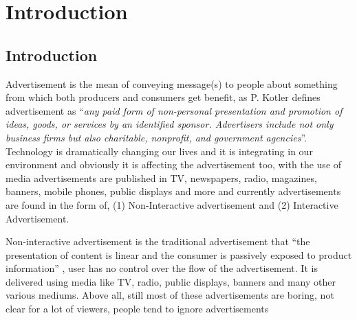 
\chapter{Introduction} %

\label{Chapter1} %
\newpage



\section{Introduction}
Advertisement is the mean of conveying message(s) to people about something from which both producers and consumers get benefit, as P. Kotler \cite{ad_def} defines advertisement as ``\emph{any paid form of non-personal presentation and promotion of ideas, goods, or services by an identified sponsor. Advertisers include not only business firms but also charitable, nonprofit, and government agencies}''. Technology is dramatically changing our lives and it is integrating in our environment and obviously it is affecting the advertisement too, with the use of media advertisements are published in TV, newspapers, radio, magazines, banners, mobile phones, public displays and more and currently advertisements are found in the form of, (1) Non-Interactive advertisement and (2) Interactive Advertisement.

Non-interactive advertisement is the traditional advertisement that “the presentation of content is linear and the consumer is passively exposed to product information” \cite{Non_inter_vs_interAd}, user has no control over the flow of the advertisement. It is delivered using media like TV, radio, public displays, banners and many other various mediums. Above all, still most of these advertisements are boring, not clear for a lot of viewers, people tend to ignore advertisements \cite{display_blindness, banner_blindness}

